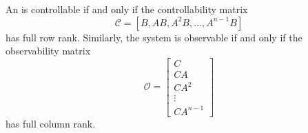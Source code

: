 \begin{definition}
    An  is controllable if and only if the controllability matrix 
    \[
        \mathcal{C} = [B, AB, A^2B, \ldots, A^{n-1}B]
    \]
    has full row rank. Similarly, the system is observable if and only if the observability matrix
    \[
        \mathcal{O} = \begin{bmatrix}
        C \\
        CA \\
        CA^2 \\
        \vdots \\
        CA^{n-1}
        \end{bmatrix}
    \]
    has full column rank.
\end{definition}
